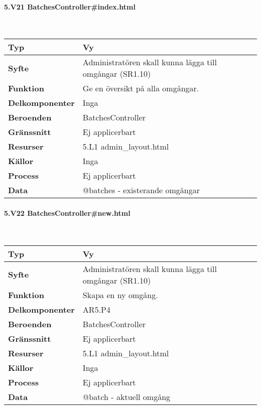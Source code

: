 \documentclass[a4paper, twoside, 11pt, titlepage]{article}
\begin{document}
			\paragraph{5.V21 BatchesController\#index.html}\

			\begin {table} [ht] \begin{tabular} {  p{3.5cm} p{11.6cm} }
				\hline
				{\sffamily\textbf{Typ}} & {Vy} \\
				\hline
				{\sffamily\textbf{Syfte}} & {Administratören skall kunna lägga till omgångar (SR1.10)} \\
				\hline
				{\sffamily\textbf{Funktion}} & {Ge en översikt på alla omgångar.} \\
				\hline
				{\sffamily\textbf{Delkomponenter}} & {Inga} \\
				\hline
				{\sffamily\textbf{Beroenden}} & {BatchesController} \\
				\hline
				{\sffamily\textbf{Gränssnitt}} & {Ej applicerbart} \\
				\hline
				{\sffamily\textbf{Resurser}} & {5.L1 admin\_layout.html} \\
				\hline
				{\sffamily\textbf{Källor}} & {Inga} \\
				\hline
				{\sffamily\textbf{Process}} & {Ej applicerbart} \\
				\hline
				{\sffamily\textbf{Data}} & {@batches - existerande omgångar} \\
				\hline
			\end{tabular} \end{table} \FloatBarrier


			\clearpage %
			\paragraph{5.V22 BatchesController\#new.html}\

			\begin {table} [ht] \begin{tabular} {  p{3.5cm} p{11.6cm} }
				\hline
				{\sffamily\textbf{Typ}} & {Vy} \\
				\hline
				{\sffamily\textbf{Syfte}} & {Administratören skall kunna lägga till omgångar (SR1.10)} \\
				\hline
				{\sffamily\textbf{Funktion}} & {Skapa en ny omgång.} \\
				\hline
				{\sffamily\textbf{Delkomponenter}} & {AR5.P4} \\
				\hline
				{\sffamily\textbf{Beroenden}} & {BatchesController} \\
				\hline
				{\sffamily\textbf{Gränssnitt}} & {Ej applicerbart} \\
				\hline
				{\sffamily\textbf{Resurser}} & {5.L1 admin\_layout.html} \\
				\hline
				{\sffamily\textbf{Källor}} & {Inga} \\
				\hline
				{\sffamily\textbf{Process}} & {Ej applicerbart} \\
				\hline
				{\sffamily\textbf{Data}} & {@batch - aktuell omgång} \\
				\hline
			\end{tabular} \end{table} \FloatBarrier
\end{document}
